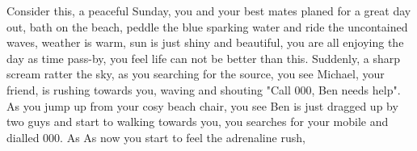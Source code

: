 Consider this, a peaceful Sunday, you and your best mates planed for a great day out, bath on the beach, peddle the blue sparking water and ride the uncontained waves, weather is warm, sun is just shiny and beautiful, you are all enjoying the day as time pass-by, you feel life can not be better than this. Suddenly, a sharp scream ratter the sky, as you searching for the source, you see Michael, your friend, is rushing towards you, waving and shouting "Call 000, Ben needs help". As you jump up from your cosy beach chair, you see Ben is just dragged up by two guys and start to walking towards you, you searches for your mobile and dialled 000. As As now you start to feel the adrenaline rush,  
